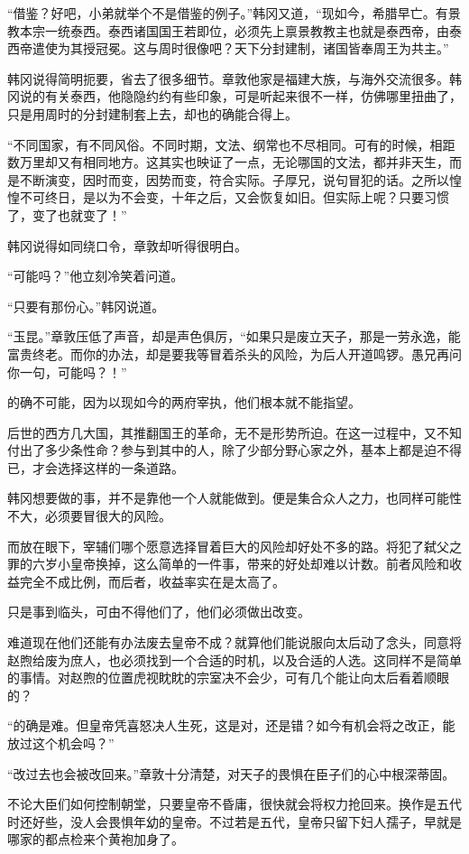 “借鉴？好吧，小弟就举个不是借鉴的例子。”韩冈又道，“现如今，希腊早亡。有景教本宗一统泰西。泰西诸国国王若即位，必须先上禀景教教主也就是泰西帝，由泰西帝遣使为其授冠冕。这与周时很像吧？天下分封建制，诸国皆奉周王为共主。”

韩冈说得简明扼要，省去了很多细节。章敦他家是福建大族，与海外交流很多。韩冈说的有关泰西，他隐隐约约有些印象，可是听起来很不一样，仿佛哪里扭曲了，只是用周时的分封建制套上去，却也的确能合得上。

“不同国家，有不同风俗。不同时期，文法、纲常也不尽相同。可有的时候，相距数万里却又有相同地方。这其实也映证了一点，无论哪国的文法，都并非天生，而是不断演变，因时而变，因势而变，符合实际。子厚兄，说句冒犯的话。之所以惶惶不可终日，是以为不会变，十年之后，又会恢复如旧。但实际上呢？只要习惯了，变了也就变了！”

韩冈说得如同绕口令，章敦却听得很明白。

“可能吗？”他立刻冷笑着问道。

“只要有那份心。”韩冈说道。

“玉昆。”章敦压低了声音，却是声色俱厉，“如果只是废立天子，那是一劳永逸，能富贵终老。而你的办法，却是要我等冒着杀头的风险，为后人开道鸣锣。愚兄再问你一句，可能吗？！”

的确不可能，因为以现如今的两府宰执，他们根本就不能指望。

后世的西方几大国，其推翻国王的革命，无不是形势所迫。在这一过程中，又不知付出了多少条性命？参与到其中的人，除了少部分野心家之外，基本上都是迫不得已，才会选择这样的一条道路。

韩冈想要做的事，并不是靠他一个人就能做到。便是集合众人之力，也同样可能性不大，必须要冒很大的风险。

而放在眼下，宰辅们哪个愿意选择冒着巨大的风险却好处不多的路。将犯了弑父之罪的六岁小皇帝换掉，这么简单的一件事，带来的好处却难以计数。前者风险和收益完全不成比例，而后者，收益率实在是太高了。

只是事到临头，可由不得他们了，他们必须做出改变。

难道现在他们还能有办法废去皇帝不成？就算他们能说服向太后动了念头，同意将赵煦给废为庶人，也必须找到一个合适的时机，以及合适的人选。这同样不是简单的事情。对赵煦的位置虎视眈眈的宗室决不会少，可有几个能让向太后看着顺眼的？

“的确是难。但皇帝凭喜怒决人生死，这是对，还是错？如今有机会将之改正，能放过这个机会吗？”

“改过去也会被改回来。”章敦十分清楚，对天子的畏惧在臣子们的心中根深蒂固。

不论大臣们如何控制朝堂，只要皇帝不昏庸，很快就会将权力抢回来。换作是五代时还好些，没人会畏惧年幼的皇帝。不过若是五代，皇帝只留下妇人孺子，早就是哪家的都点检来个黄袍加身了。

